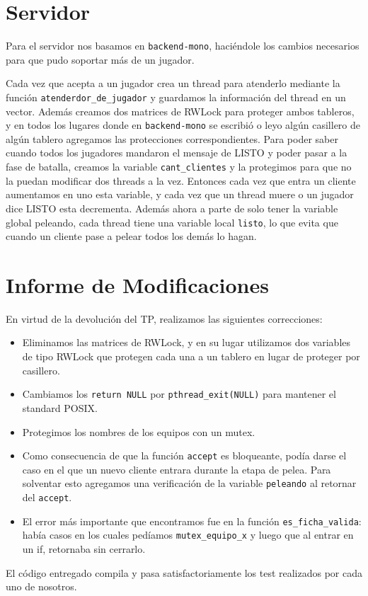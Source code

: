 \documentclass[hidelinks,a4paper,12pt, nofootinbib]{article}
\begin{document}
\section{Servidor}
Para el servidor nos basamos en \texttt{backend-mono}, haciéndole los cambios necesarios para que pudo soportar más de un jugador. 

Cada vez que acepta a un jugador crea un thread para atenderlo mediante la función \texttt{atenderdor\_de\_jugador} y guardamos la información del thread en un vector. Además creamos dos matrices de RWLock para proteger ambos tableros, y en todos los lugares donde en \texttt{backend-mono} se escribió o leyo algún casillero de algún tablero agregamos las protecciones correspondientes.
Para poder saber cuando todos los jugadores mandaron el mensaje de LISTO y poder pasar a la fase de batalla, creamos la variable \texttt{cant\_clientes} y la protegimos para que no la puedan modificar dos threads a la vez. Entonces cada vez que entra un cliente aumentamos en uno esta variable, y cada vez que un thread muere o un jugador dice LISTO esta decrementa. Además ahora a parte de solo tener la variable global peleando, cada thread tiene una variable local \texttt{listo}, lo que evita que cuando un cliente pase a pelear todos los demás lo hagan.

\section{Informe de Modificaciones}
En virtud de la devolución del TP, realizamos las siguientes correcciones:

\begin{itemize}
	\item Eliminamos las matrices de RWLock, y en su lugar utilizamos dos variables de tipo \mbox{RWLock} que protegen cada una a un tablero en lugar de proteger por casillero.
	\item Cambiamos los \texttt{return NULL} por \texttt{pthread\_exit(NULL)} para mantener el standard \mbox{POSIX}.
	\item Protegimos los nombres de los equipos con un mutex.
	\item Como consecuencia de que la función \texttt{accept} es bloqueante, podía darse el caso en el que un nuevo cliente entrara durante la etapa de pelea. Para solventar esto agregamos una verificación de la variable \texttt{peleando} al retornar del \texttt{accept}.
	\item El error más importante que encontramos fue en la función \texttt{es\_ficha\_valida}: había casos en los cuales pedíamos \texttt{mutex\_equipo\_x} y luego que al entrar en un if, retornaba sin cerrarlo. 
\end{itemize}

El código entregado compila y pasa satisfactoriamente los test realizados por cada uno de nosotros.
\end{document}
